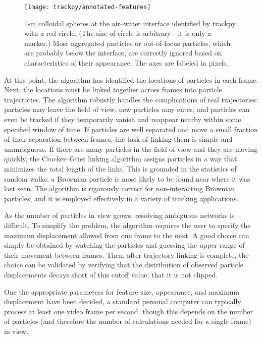    \begin{figure}
    \centering
    \texttt{[image: trackpy/annotated-features]}
    \caption{\label{fig:annotated-features}1-\textmu m colloidal spheres at the air--water interface identified by trackpy with a red circle. (The size of circle is arbitrary---it is only a marker.) Most aggregated particles or out-of-focus particles, which are probably below the interface, are correctly ignored based on characteristics of their appearance. The axes are labeled in pixels.}
    \end{figure}

At this point, the algorithm has identified the locations of particles in each frame. Next, the locations must be linked together across frames into particle trajectories. The algorithm robustly handles the complications of real trajectories: particles may leave the field of view, new particles may enter, and particles can even be tracked if they temporarily vanish and reappear nearby within some specified window of time. If particles are well separated and move a small fraction of their separation between frames, the task of linking them is simple and unambiguous. If there are many particles in the field of view and they are moving quickly, the Crocker--Grier linking algorithm assigns particles in a way that minimizes the total length of the links. This is grounded in the statistics of random walks; a Brownian particle is most likely to be found near where it was last seen. The algorithm is rigorously correct for non-interacting Brownian particles\cite{Crocker1996}, and it is employed effectively in a variety of tracking applications.

As the number of particles in view grows, resolving ambiguous networks is difficult. To simplify the problem, the algorithm requires the user to specify the maximum displacement allowed from one frame to the next. A good choice can simply be obtained by watching the particles and guessing the upper range of their movement between frames. Then, after trajectory linking is complete, the choice can be validated by verifying that the distribution of observed particle displacements decays short of this cutoff value, that it is not clipped.

One the appropriate parameters for feature size, appearance, and maximum displacement have been decided, a standard personal computer can typically process at least one video frame per second, though this depends on the number of particles (and therefore the number of calculations needed for a single frame) in view.

